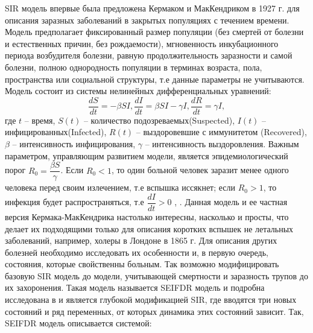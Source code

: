 SIR модель впервые была предложена Кермаком и МакКендриком в 1927 г. для описания заразных заболеваний в закрытых популяциях с течением времени. Модель предполагает фиксированный  размер популяции (без смертей от болезни и естественных причин, без рождаемости), мгновенность инкубационного периода возбудителя болезни, равную продолжительность заразности и самой болезни, полною однородность популяции в терминах возраста, пола, пространства или социальной структуры, т.е данные параметры не учитываются. Модель состоит из системы нелинейных дифференциальных уравнений: \\
\begin{equation} \label{SIR_model:1}
	\dfrac{dS}{dt} =  -\beta SI , 
	\dfrac{dI}{dt} = \beta SI - \gamma I ,
	\dfrac{dR}{dt} = \gamma I , 	
\end{equation}
где $t$ -- время, $S(t)$ -- количество подозреваемых(Suspected), $I(t)$ -- инфицированных(Infected), $R(t)$ -- выздоровевшие с иммунитетом (Recovered), $\beta$ -- интенсивность инфицирования, $ \gamma $ -- интенсивность выздоровления. Важным параметром, управляющим развитием модели, является эпидемиологический порог $R_0 = \dfrac{\beta S}{\gamma} $. Если $R_0 < 1$, то один больной человек заразит  менее одного человека перед своим излечением, т.е вспышка иссякнет; если $R_0 > 1$, то инфекция будет распространяться, т.е $\dfrac{dI}{dt} > 0$  %
\cite{Wolfram_MW:SIR} \cite{Anderson_May:1979}, \cite{Kermack_McKendrick:1927}.
Данная модель и ее частная версия Кермака-МакКендрика настолько интересны, насколько и просты, что делает их подходящими только для описания  коротких вспышек не летальных заболеваний, например, холеры в Лондоне в 1865 г. Для описания других болезней необходимо исследовать их особенности и, в первую очередь, состояния, которые свойственны больным. Так возможно  модифицировать базовую SIR модель до модели, учитывающей смертности и заразность трупов до их захоронения. Такая модель называется SEIFDR модель и подробна исследована  в %
и является глубокой модификацией SIR, где вводятся три новых состояний и ряд переменных, от которых динамика этих состояний зависит. Так, SEIFDR модель описывается системой:
